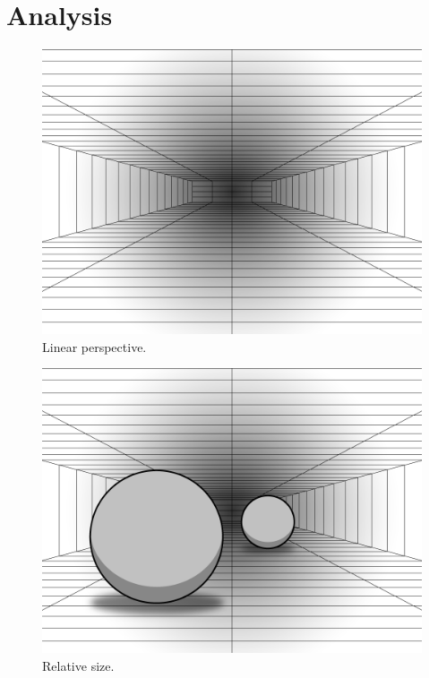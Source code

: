 \section{Analysis}

\begin{figure}[H]
	\centering
	\includegraphics[width=1\linewidth]{figure/Analysis/linearPerspective.png}
	\caption{Linear perspective.}
	\label{fig:linearPerspective}
\end{figure}

\begin{figure}[H]
	\centering
	\includegraphics[width=1\linewidth]{figure/Analysis/relativeSize.png}
	\caption{Relative size.}
	\label{fig:relativeSize}
\end{figure}


